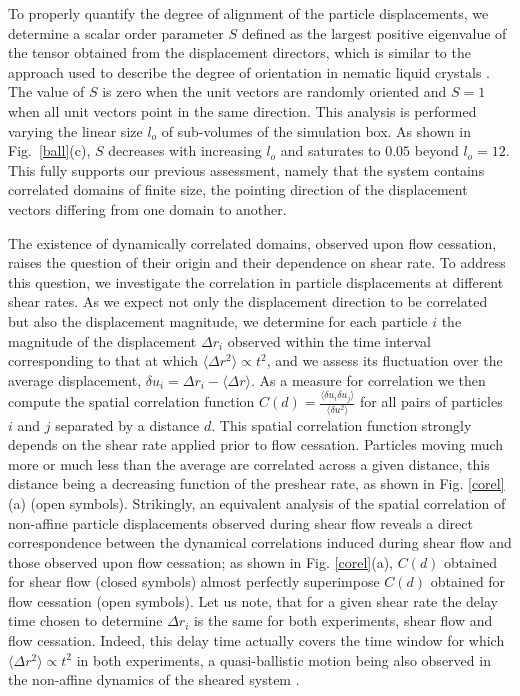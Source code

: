 \documentclass[%
preprint,
 amsmath,amssymb,
 aps,
]{revtex4-1}
\begin{document}
To properly quantify the degree of alignment of the particle displacements, we determine a scalar order parameter $S$ defined as the largest positive eigenvalue of the tensor obtained from the displacement directors, which is similar to the approach used to describe the degree of orientation in nematic liquid crystals  \cite{chaikin1995principles}. 
The value of $S$ is zero when the unit vectors are randomly oriented and $S=1$ when all unit vectors point in the same direction. This analysis is performed varying the linear size $l_o$ of sub-volumes of the simulation box. As shown in Fig.~\ref{ball}(c), $S$ decreases with increasing $l_o$ and saturates to $0.05$ beyond $l_o=12$. This fully supports our previous assessment, namely that the system contains correlated domains of finite size, the pointing direction of the displacement vectors differing from one domain to another.

The existence of dynamically correlated domains, observed upon flow cessation, raises the question of their origin and their dependence on shear rate. To address this question, we investigate the correlation in particle displacements at different shear rates. As we expect not only the displacement direction to be correlated but also the displacement magnitude, we determine for each particle $i$ the magnitude of the displacement $\Delta r_i$ observed within the time interval corresponding to that at which $\langle \Delta r^2 \rangle \propto t^2 $, and we assess its fluctuation over the average displacement, $\delta u_i = \Delta r_i - \langle \Delta r \rangle$. As a measure for correlation we then compute the spatial correlation function $C(d) = \frac{\langle \delta u_i \delta u_j \rangle}{\langle \delta u^2 \rangle}$ for all pairs of particles $i$ and $j$ separated by a distance $d$. This spatial correlation function strongly depends on the shear rate applied prior to flow cessation. Particles moving much more or much less than the average are correlated across a given distance, this distance being a decreasing function of the preshear rate, as shown in Fig. \ref{corel}(a) (open symbols). 
Strikingly, an equivalent analysis of the spatial correlation of non-affine particle displacements observed during shear flow
reveals a direct correspondence between the dynamical correlations induced during shear flow and those observed upon flow cessation; as shown in Fig. \ref{corel}(a), $C(d)$ obtained for shear flow (closed symbols) almost perfectly superimpose $C(d)$ obtained for flow cessation (open symbols). Let us note, that for a given shear rate the delay time chosen to determine $\Delta r_i$ is the same for both experiments, shear flow and flow cessation. Indeed, this delay time actually covers the time window for which $\langle \Delta r^2 \rangle \propto t^2 $ in both experiments, a quasi-ballistic motion being also observed in the non-affine dynamics of the sheared system \cite{vasisht2018rate,khabaz2020particle}.   
\end{document}

